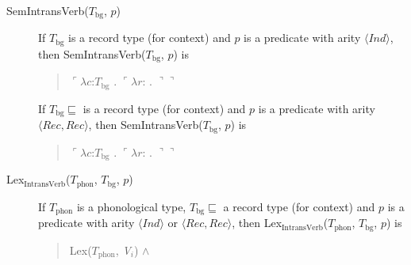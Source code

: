 \begin{description}
      \item[\textnormal{SemIntransVerb($T_{\mathrm{bg}}$, $p$)}]
        \mbox{}

        If $T_{\text{bg}}$ is a record type (for context) and $p$ is a
        predicate with arity $\langle\textit{Ind}\rangle$, then SemIntransVerb($T_{\mathrm{bg}}$, $p$) is
        \begin{quote}
          $\ulcorner\lambda c$:$T_{\mathrm{bg}}$ . $\ulcorner\lambda
          r$:
          . $\urcorner\urcorner$
        \end{quote}

        If $T_{\text{bg}}\sqsubseteq$ is a record type (for context) and $p$ is a
        predicate with arity $\langle\textit{Rec}, \textit{Rec}\rangle$, then SemIntransVerb($T_{\mathrm{bg}}$, $p$) is
        \begin{quote}
          $\ulcorner\lambda c$:$T_{\mathrm{bg}}$ . $\ulcorner\lambda
          r$:
          . $\urcorner\urcorner$
        \end{quote}

        
      \item[\textnormal{Lex$_{\mathrm{IntransVerb}}$($T_{\mathrm{phon}}$,
          $T_{\mathrm{bg}}$, $p$)}] \mbox{}


        If $T_{\mathrm{phon}}$ is a phonological type,
        $T_{\mathrm{bg}}\sqsubseteq$ a record type (for context) and $p$ is a
        predicate with arity $\langle\textit{Ind}\rangle$ or $\langle\textit{Rec}, \textit{Rec}\rangle$, then Lex$_{\mathrm{IntransVerb}}$($T_{\mathrm{phon}}$,
        $T_{\mathrm{bg}}$, $p$) is
        \begin{quote}
          Lex($T_{\mathrm{phon}}$, \textit{V$_i$}) \d{$\wedge$}
        \end{quote}


\end{description}
